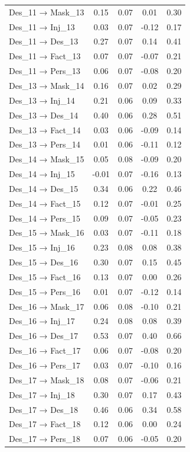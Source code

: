 \documentclass[
  man, donotrepeattitle,floatsintext]{apa6}
\begin{document}
\begin{center}
\begin{ThreePartTable}
{\begin{longtable}{lcccc}
Des\_11 → Mask\_13 & 0.15 & 0.07 & 0.01 & 0.30\\
Des\_11 → Inj\_13 & 0.03 & 0.07 & -0.12 & 0.17\\
Des\_11 → Des\_13 & 0.27 & 0.07 & 0.14 & 0.41\\
Des\_11 → Fact\_13 & 0.07 & 0.07 & -0.07 & 0.21\\
Des\_11 → Pers\_13 & 0.06 & 0.07 & -0.08 & 0.20\\
Des\_13 → Mask\_14 & 0.16 & 0.07 & 0.02 & 0.29\\
Des\_13 → Inj\_14 & 0.21 & 0.06 & 0.09 & 0.33\\
Des\_13 → Des\_14 & 0.40 & 0.06 & 0.28 & 0.51\\
Des\_13 → Fact\_14 & 0.03 & 0.06 & -0.09 & 0.14\\
Des\_13 → Pers\_14 & 0.01 & 0.06 & -0.11 & 0.12\\
Des\_14 → Mask\_15 & 0.05 & 0.08 & -0.09 & 0.20\\
Des\_14 → Inj\_15 & -0.01 & 0.07 & -0.16 & 0.13\\
Des\_14 → Des\_15 & 0.34 & 0.06 & 0.22 & 0.46\\
Des\_14 → Fact\_15 & 0.12 & 0.07 & -0.01 & 0.25\\
Des\_14 → Pers\_15 & 0.09 & 0.07 & -0.05 & 0.23\\
Des\_15 → Mask\_16 & 0.03 & 0.07 & -0.11 & 0.18\\
Des\_15 → Inj\_16 & 0.23 & 0.08 & 0.08 & 0.38\\
Des\_15 → Des\_16 & 0.30 & 0.07 & 0.15 & 0.45\\
Des\_15 → Fact\_16 & 0.13 & 0.07 & 0.00 & 0.26\\
Des\_15 → Pers\_16 & 0.01 & 0.07 & -0.12 & 0.14\\
Des\_16 → Mask\_17 & 0.06 & 0.08 & -0.10 & 0.21\\
Des\_16 → Inj\_17 & 0.24 & 0.08 & 0.08 & 0.39\\
Des\_16 → Des\_17 & 0.53 & 0.07 & 0.40 & 0.66\\
Des\_16 → Fact\_17 & 0.06 & 0.07 & -0.08 & 0.20\\
Des\_16 → Pers\_17 & 0.03 & 0.07 & -0.10 & 0.16\\
Des\_17 → Mask\_18 & 0.08 & 0.07 & -0.06 & 0.21\\
Des\_17 → Inj\_18 & 0.30 & 0.07 & 0.17 & 0.43\\
Des\_17 → Des\_18 & 0.46 & 0.06 & 0.34 & 0.58\\
Des\_17 → Fact\_18 & 0.12 & 0.06 & 0.00 & 0.24\\
Des\_17 → Pers\_18 & 0.07 & 0.06 & -0.05 & 0.20\\

\end{longtable}}
\end{ThreePartTable}
\end{center}
\end{document}
